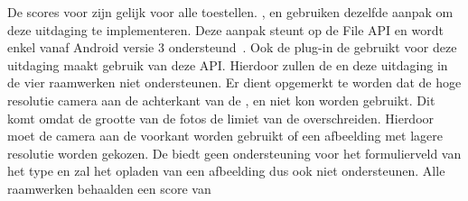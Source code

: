 De scores voor  zijn gelijk voor alle toestellen.
\kendo{}, \jqm{} en \lungo{} gebruiken dezelfde aanpak om deze uitdaging te implementeren.
Deze aanpak steunt op de File API en wordt enkel vanaf Android versie 3 ondersteund~\cite{Deveria2013a}.
Ook de plug-in de \st{} gebruikt voor deze uitdaging maakt gebruik van deze API.
Hierdoor zullen de \htc{} en \gtab{} deze uitdaging in de vier raamwerken niet ondersteunen.
Er dient opgemerkt te worden dat de hoge resolutie camera aan de achterkant van de \ipadiii{}, \iphoneiii{} en \iphoneiv{} niet kon worden gebruikt.
Dit komt omdat de grootte van de fotos de limiet van de  overschreiden.%
Hierdoor moet de camera aan de voorkant worden gebruikt of een afbeelding met lagere resolutie worden gekozen.
De \ipadi{} biedt geen ondersteuning voor het formulierveld van het type  en zal het opladen van een afbeelding dus ook niet ondersteunen.%
Alle raamwerken behaalden een score van 

% 
% 
% 
% 

